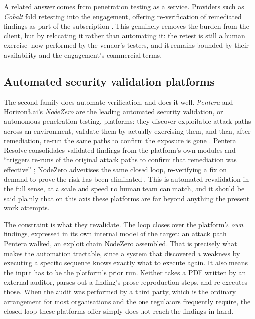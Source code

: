 A related answer comes from penetration testing as a service. Providers such as
\emph{Cobalt} fold retesting into the engagement, offering re-verification of remediated
findings as part of the subscription \cite{cobalt_pentesting_2025}. This genuinely
removes the burden from the client, but by relocating it rather than automating it: the
retest is still a human exercise, now performed by the vendor's testers, and it remains
bounded by their availability and the engagement's commercial terms.

\subsection{Automated security validation platforms}
\label{subsec:sota-asv}

The second family does automate verification, and does it well. \emph{Pentera} and
Horizon3.ai's \emph{NodeZero} are the leading automated security validation, or
autonomous penetration testing, platforms: they discover exploitable attack paths
across an environment, validate them by actually exercising them, and then, after
remediation, re-run the same paths to confirm the exposure is gone
\cite{pentera_resolve, nodezero}. Pentera Resolve consolidates validated findings from
the platform's own modules and ``triggers re-runs of the original attack paths to
confirm that remediation was effective'' \cite{pentera_resolve}; NodeZero advertises the
same closed loop, re-verifying a fix on demand to prove the risk has been eliminated
\cite{nodezero}. This is automated revalidation in the full sense, at a scale and speed
no human team can match, and it should be said plainly that on this axis these
platforms are far beyond anything the present work attempts.

The constraint is what they revalidate. The loop closes over the platform's \emph{own}
findings, expressed in its own internal model of the target: an attack path Pentera
walked, an exploit chain NodeZero assembled. That is precisely what makes the automation
tractable, since a system that discovered a weakness by executing a specific sequence
knows exactly what to execute again. It also means the input has to be the platform's
prior run. Neither takes a PDF written by an external auditor, parses out a finding's
prose reproduction steps, and re-executes those. When the audit was performed by a third
party, which is the ordinary arrangement for most organisations and the one regulators
frequently require, the closed loop these platforms offer simply does not reach the
findings in hand.

